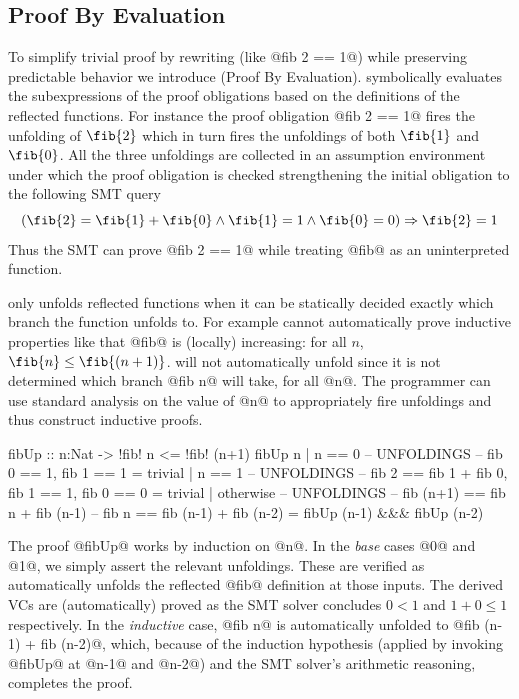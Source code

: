 \subsection{Proof By Evaluation}

To simplify trivial proof by rewriting (like @fib 2 == 1@) while preserving
predictable behavior we introduce \pbename (Proof By Evaluation).
%
\pbename symbolically evaluates the subexpressions of the proof
obligations based on the definitions of the
reflected functions.
%
For instance the proof obligation
@fib 2 == 1@ fires the unfolding of $\fib{2}$
which in turn fires the unfoldings of
both $\fib{1}$ and $\fib{0}$.
%
All the three unfoldings are collected in an assumption
environment under which the proof obligation is checked
strengthening the initial obligation to the
following SMT query
$$
(\fib{2} = \fib{1} + \fib{0}
\land
\fib{1} = 1
\land
\fib{0} = 0
) \Rightarrow \fib{2} = 1
$$
%
Thus the SMT can prove @fib 2 == 1@
while treating @fib@ as an uninterpreted function.


\pbename only unfolds reflected functions when it
can be statically decided exactly which branch the function unfolds to.
%
%
For example \pbename cannot automatically prove inductive properties like
that @fib@ is (locally) increasing: for all $n$, $\fib{n} \leq \fib{(n+1)}$.
%
\pbename will not automatically unfold  since it is not
determined which branch @fib n@ will take, for all @n@.
%
The programmer can use standard analysis on the value of @n@
to appropriately fire \pbename unfoldings and thus construct inductive proofs.
%
\begin{mcode}
    fibUp :: n:Nat -> { !fib! n <= !fib! (n+1) }
    fibUp n | n == 0
            -- UNFOLDINGS
            -- fib 0 == 1, fib 1 == 1
            =  trivial
            | n == 1
            -- UNFOLDINGS
            -- fib 2 == fib 1 + fib 0, fib 1 == 1, fib 0 == 0
            = trivial
            | otherwise
            -- UNFOLDINGS
            -- fib (n+1) == fib n + fib (n-1)
            -- fib n == fib (n-1) + fib (n-2)
            =  fibUp (n-1) &&& fibUp (n-2)
\end{mcode} %

%
The proof @fibUp@ works by induction on @n@.
%
In the \emph{base} cases @0@ and @1@, we simply assert
the relevant unfoldings. These are verified as \pbename automatically
unfolds the
reflected @fib@ definition at those inputs.
%
The derived VCs are (automatically) proved
as the SMT solver concludes $0 < 1$ and $1 + 0 \leq 1$
respectively.
%
In the \emph{inductive} case, @fib n@ is automatically unfolded
to  @fib (n-1) + fib (n-2)@, which, because of the
induction hypothesis (applied by invoking @fibUp@
at @n-1@ and @n-2@) and the SMT solver's arithmetic
reasoning, completes the proof.

